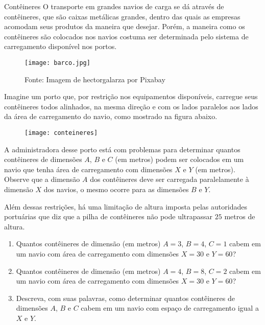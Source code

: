 \begin{task}{Contêineres}
\label{comp-task4}
O transporte em grandes navios de carga se dá através de contêineres, que são caixas metálicas grandes, dentro das quais as empresas acomodam seus produtos da maneira que desejar. Porém, a maneira como os contêineres são colocados nos navios costuma ser determinada pelo sistema de carregamento disponível nos portos.

\begin{figure}[H]
\centering
\texttt{[image: barco.jpg]}
\caption{Fonte: Imagem de hectorgalarza por Pixabay}
\end{figure}


Imagine um porto que, por restrição nos equipamentos disponíveis, carregue seus contêineres todos alinhados, na mesma direção e com os lados paralelos aos lados da área de carregamento do navio, como mostrado na figura abaixo.

\begin{figure}[H]
\centering

\texttt{[image: conteineres]}
\end{figure}

A administradora desse porto está com problemas para determinar quantos contêineres de dimensões $A$, $B$ e $C$ (em metros) podem ser colocados em um navio que tenha área de carregamento com dimensões $X$ e $Y$ (em metros). Observe que a dimensão $A$ dos contêineres deve ser carregada paralelamente à dimensão $X$ dos navios, o mesmo ocorre para as dimensões $B$ e $Y$.

Além dessas restrições, há uma limitação de altura imposta pelas autoridades portuárias que diz que a pilha de contêineres não pode ultrapassar $25$ metros de altura.

\begin{enumerate}
\item Quantos contêineres de dimensão (em metros) $A=3$, $B=4$, $C=1$ cabem em um navio com área de carregamento com dimensões $X=30$ e $Y=60$?

\item Quantos contêineres de dimensão (em metros) $A=4$, $B=8$, $C=2$ cabem em um navio com área de carregamento com dimensões $X=30$ e $Y=60$?

\item Descreva, com suas palavras, como determinar quantos contêineres de dimensões $A$, $B$ e $C$ cabem em um navio com espaço de carregamento igual a $X$ e $Y$.
\end{enumerate}
\end{task}

